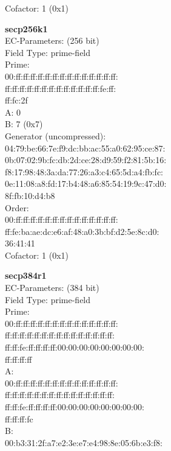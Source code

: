 Cofactor:  1 (0x1)\\
\item \textbf{ secp256k1 }\\
EC-Parameters: (256 bit)\\
Field Type: prime-field\\
Prime:\\
    00:ff:ff:ff:ff:ff:ff:ff:ff:ff:ff:ff:ff:ff:ff:\\
    ff:ff:ff:ff:ff:ff:ff:ff:ff:ff:ff:ff:ff:fe:ff:\\
    ff:fc:2f\\
A:    0\\
B:    7 (0x7)\\
Generator (uncompressed):\\
    04:79:be:66:7e:f9:dc:bb:ac:55:a0:62:95:ce:87:\\
    0b:07:02:9b:fc:db:2d:ce:28:d9:59:f2:81:5b:16:\\
    f8:17:98:48:3a:da:77:26:a3:c4:65:5d:a4:fb:fc:\\
    0e:11:08:a8:fd:17:b4:48:a6:85:54:19:9c:47:d0:\\
    8f:fb:10:d4:b8\\
Order: \\
    00:ff:ff:ff:ff:ff:ff:ff:ff:ff:ff:ff:ff:ff:ff:\\
    ff:fe:ba:ae:dc:e6:af:48:a0:3b:bf:d2:5e:8c:d0:\\
    36:41:41\\
Cofactor:  1 (0x1)\\
\item \textbf{ secp384r1 }\\
EC-Parameters: (384 bit)\\
Field Type: prime-field\\
Prime:\\
    00:ff:ff:ff:ff:ff:ff:ff:ff:ff:ff:ff:ff:ff:ff:\\
    ff:ff:ff:ff:ff:ff:ff:ff:ff:ff:ff:ff:ff:ff:ff:\\
    ff:ff:fe:ff:ff:ff:ff:00:00:00:00:00:00:00:00:\\
    ff:ff:ff:ff\\
A:   \\
    00:ff:ff:ff:ff:ff:ff:ff:ff:ff:ff:ff:ff:ff:ff:\\
    ff:ff:ff:ff:ff:ff:ff:ff:ff:ff:ff:ff:ff:ff:ff:\\
    ff:ff:fe:ff:ff:ff:ff:00:00:00:00:00:00:00:00:\\
    ff:ff:ff:fc\\
B:   \\
    00:b3:31:2f:a7:e2:3e:e7:e4:98:8e:05:6b:e3:f8:\\

